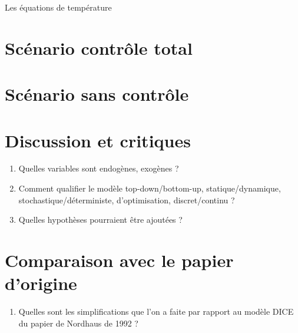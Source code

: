 \documentclass[12pt]{article}
\theoremstyle{remark}
\begin{document}
Les équations de température

\section{Scénario contrôle total}


\section{Scénario sans contrôle}


\section{Discussion et critiques}
\begin{enumerate}[resume]
\item Quelles variables sont endogènes, exogènes ?
\item Comment qualifier le modèle top-down/bottom-up, statique/dynamique, stochastique/déterministe, d'optimisation, discret/continu ?
\item Quelles hypothèses pourraient être ajoutées ?
\end{enumerate}

\section{Comparaison avec le papier d'origine}
\begin{enumerate}[resume]
\item Quelles sont les simplifications que l'on a faite par rapport au modèle DICE du papier de Nordhaus de 1992 ?
\end{enumerate}
\end{document}
